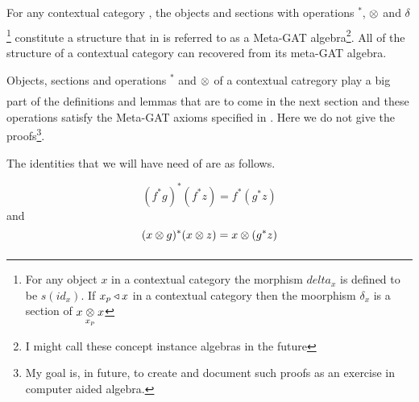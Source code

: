 
For any contextual category \catc, the objects and sections with  operations $^*$,  $\crossx{}{}{}$ 
and $\delta$\footnote{For any object $x$ in a contextual category the morphism $delta_x$ is defined to be  $s(id_x)$. If $x_p \base x$ in 
a contextual category \catcw then the moorphism $\delta_x$ is a section of $\crossx{x}{x}{x_p}$} constitute a structure
that in \cite{CartmellMetaTheory} is referred to as a Meta-GAT algebra\footnote{I might call these concept instance algebras in the future}. 
All of the structure of a contextual category  can recovered from its meta-GAT algebra.

Objects, sections and operations $^*$ and  $\crossx{}{}{}$ of a contextual catregory play a big part of the definitions and lemmas that are to come in the next section
and these operations satisfy the Meta-GAT axioms specified in  \cite{CartmellMetaTheory}.
Here we do not give the proofs\footnote{My goal is, in future, to create and document such proofs as an exercise in computer aided algebra.}.

The identities that we will have need of are as follows. 

\begin{equation}
\label{metagattriplestar}
(f^*g)^*(f^*z)=f^*(g^*z)
\end{equation}
and
\begin{equation}
\label{metagatcrossstarcross}
(\crossx{x}{g}{})^*(\crossx{x}{z}{})=\crossx{x}{(g^*z)}{}
\end{equation}